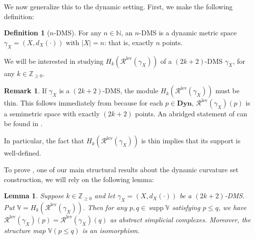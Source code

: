 \documentclass[a4paper,UKenglish,thm-restate]{article}
\newtheorem{lemma}[theorem]{Lemma}
\theoremstyle{definition}
\newtheorem{definition}[theorem]{Definition}
\newtheorem{remark}[theorem]{Remark}
\def\bbv{\mathbb{V}}
\def\bdyn{\mathbf{Dyn}}
\DeclareMathOperator{\supp}{supp}
\begin{document}
    We now generalize this to the dynamic setting. First, we make the following definition:
    \begin{definition}[$n$-DMS]
        For any $n \in \mathbb{N}$, an $n$-DMS is a dynamic metric space $\gamma_X = (X, d_X(\cdot))$ with $|X| = n$: that is, exactly $n$ points.
    \end{definition}
    We will be interested in studying $H_k(\mathcal{R}^{\mathrm{lev}}(\gamma_X))$ of a $(2k+2)$-DMS $\gamma_X$, for any $k \in \mathbb{Z}_{\geq 0}$.
    \begin{remark} \label{rem:moduledimension}
        If $\gamma_X$ is a $(2k+2)$-DMS, the module $H_k(\mathcal{R}^{\mathrm{lev}}(\gamma_X))$ must be thin. This follows immediately from \cite[Theorem 4.4(B)]{curvaturesets} because for each $p \in \bdyn$, $\mathcal{R}^{\mathrm{lev}}(\gamma_X)(p)$ is a semimetric space with exactly $(2k+2)$ points. An abridged statement of \cite[Theorem 4.4(B)]{curvaturesets} can be found in .

        In particular, the fact that $H_k(\mathcal{R}^{\mathrm{lev}}(\gamma_X))$ is thin implies that its support is well-defined.
    \end{remark}
    To prove , one of our main structural results about the dynamic curvature set construction, we will rely on the following lemma:
    \begin{lemma}\label{lem:structuremaps}
        Suppose $k \in \mathbb{Z}_{\geq 0}$ and let $\gamma_X = (X, d_X(\cdot))$ be a $(2k+2)$-DMS. Put $\bbv = H_k(\mathcal{R}^{\mathrm{lev}}(\gamma_X))$. Then for any $p, q \in \supp \bbv$ satisfying $p \leq q$, we have $\mathcal{R}^{\mathrm{lev}}(\gamma_X)(p) = \mathcal{R}^{\mathrm{lev}}(\gamma_X)(q)$ as abstract simplicial complexes. Moreover, the structure map $\bbv(p \leq q)$ is an isomorphism.
    \end{lemma}
\end{document}
